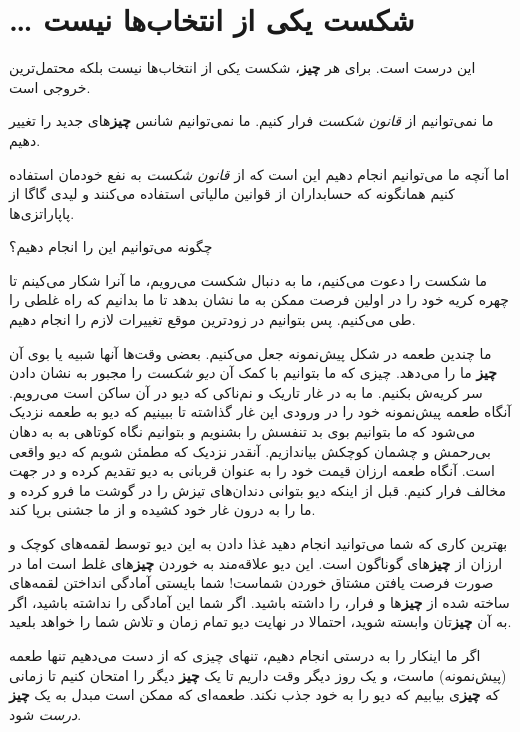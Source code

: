 \section{\ldots{} شکست یکی از انتخاب‌ها
نیست}\label{ux634ux6a9ux633ux62a-ux6ccux6a9ux6cc-ux627ux632-ux627ux646ux62aux62eux627ux628ux647ux627-ux646ux6ccux633ux62a}

این درست است. برای هر \textbf{چیز}، شکست یکی از انتخاب‌ها نیست بلکه
محتمل‌ترین خروجی است.

ما نمی‌توانیم از \emph{قانون شکست} فرار کنیم. ما نمی‌توانیم شانس
\textbf{چیز}های جدید را تغییر دهیم.

اما آنچه ما می‌توانیم انجام دهیم این است که از \emph{قانون شکست} به نفع
خودمان استفاده کنیم همانگونه که حسابداران از قوانین مالیاتی استفاده
می‌کنند و لیدی گاگا از پاپاراتزی‌ها.

چگونه می‌توانیم این را انجام دهیم؟

ما شکست را دعوت می‌کنیم، ما به دنبال شکست می‌رویم، ما آنرا شکار می‌کینم
تا چهره کریه خود را در اولین فرصت ممکن به ما نشان بدهد تا ما بدانیم که
راه غلطی را طی می‌کنیم. پس بتوانیم در زودترین موقع تغییرات لازم را انجام
دهیم.

ما چندین طعمه در شکل پیش‌نمونه جعل می‌کنیم. بعضی وقت‌ها آنها شبیه یا بوی
آن \textbf{چیز} ما را می‌دهد. چیزی که ما بتوانیم با کمک آن \emph{دیو
شکست} را مجبور به نشان دادن سر کریه‌ش بکنیم. ما به در غار تاریک و
نم‌ناکی که دیو در آن ساکن است می‌رویم. آنگاه طعمه پیش‌نمونه خود را در
ورودی این غار گذاشته تا ببینیم که دیو به طعمه نزدیک می‌شود که ما بتوانیم
بوی بد تنفسش را بشنویم و بتوانیم نگاه کوتاهی به به دهان بی‌رحمش و چشمان
کوچکش بیاندازیم. آنقدر نزدیک که مطمئن شویم که دیو واقعی است. آنگاه طعمه
ارزان قیمت خود را به عنوان قربانی به دیو تقدیم کرده و در جهت مخالف فرار
کنیم. قبل از اینکه دیو بتوانی دندان‌های تیزش را در گوشت ما فرو کرده و ما
را به درون غار خود کشیده و از ما جشنی برپا کند.

بهترین کاری که شما می‌توانید انجام دهید غذا دادن به این دیو توسط
لقمه‌های کوچک و ارزان از \textbf{چیز}های گوناگون است. این دیو علاقه‌مند
به خوردن \textbf{چیز}های غلط است اما در صورت فرصت یافتن مشتاق خوردن
شماست! شما بایستی آمادگی انداختن لقمه‌های ساخته شده از \textbf{چیز}ها و
فرار، را داشته باشید. اگر شما این آمادگی را نداشته باشید، اگر به آن
\textbf{چیز}تان وابسته شوید، احتمالا در نهایت دیو تمام زمان و تلاش شما
را خواهد بلعید.

اگر ما اینکار را به درستی انجام دهیم، تنهای چیزی که از دست می‌دهیم تنها
طعمه (پیش‌نمونه) ماست، و یک روز دیگر وقت داریم تا یک \textbf{چیز} دیگر
را امتحان کنیم تا زمانی که \textbf{چیز}ی بیابیم که دیو را به خود جذب
نکند. طعمه‌ای که ممکن است مبدل به یک \textbf{چیز} \emph{درست} شود.
